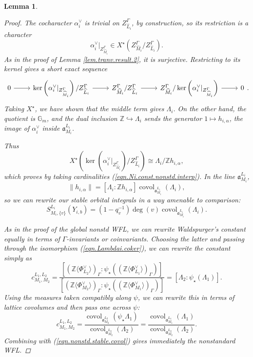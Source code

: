 \documentclass[openany]{amsbook}
\newtheorem{lemma}[theorem]{Lemma}
\theoremstyle{definition}
\theoremstyle{remark}
\numberwithin{equation}{section}
\newcommand{\Z}{\mathbb{Z}}
\newcommand{\G}{\mathbb{G}}
\renewcommand{\-}{\operatorname{-}}
\renewcommand{\a}{\mathfrak{a}}
\newcommand{\on}[1]{\operatorname{#1}}
\begin{document}
\begin{lemma}
\begin{proof}
        The cocharacter $\alpha_i^\vee$ is trivial on $Z_{\widehat{L}_i}^\Gamma$, by construction, so its restriction is a character
        $$
            \alpha_i^\vee |_{Z_{\widehat{M}_i}^\Gamma} \in X^\star\left(Z_{\widehat{M}_i}^\Gamma/Z_{\widehat{L}_i}^\Gamma\right).
        $$
        As in the proof of Lemma \ref{lem.tranv.result.2}, it is surjective. Restricting to its kernel gives a short exact sequence
        $$
        \begin{tikzcd}
            0 \ar[r] & \ker\left( \alpha_i^\vee |_{Z_{\widehat{M}_i}^\Gamma}\right)/Z_{\widehat{L}_i}^\Gamma \ar[r] & Z_{\widehat{M}_i}^\Gamma/Z_{\widehat{L}_i}^\Gamma \ar[r] & Z_{\widehat{M}_i}^\Gamma/\ker\left( \alpha_i^\vee |_{Z_{\widehat{M}_i}^\Gamma}\right) \ar[r] & 0
        \end{tikzcd}.
        $$
        Taking $X^\star$, we have shown that the middle term gives $\Lambda_i$. On the other hand, the quotient is $\G_m$, and the dual inclusion $\Z \hookrightarrow \Lambda_i$ sends the generator $1 \mapsto h_{i, \alpha}$, the image of $\alpha_i^\vee$ inside $\a_{M_i}^{L_i}$.
        
        Thus
        $$
            X^\star\left(\ker\left( \alpha_i^\vee |_{Z_{\widehat{M}_i}^\Gamma}\right) / Z_{\widehat{L}_i}^\Gamma \right) \cong \Lambda_i/\Z h_{i, \alpha},
        $$
        which proves by taking cardinalities (\ref{eqn.Ni.const.nonstd.interp}). In the line $\a_{M_i}^{L_i}$, 
        $$
            \|h_{i, \alpha}\| = [\Lambda_i : \Z h_{i,\alpha}] \on{covol}_{\a_{M_i}^{L_i}}(\Lambda_i),
        $$
        so we can rewrite our stable orbital integrals in a way amenable to comparison:
        \begin{equation}
            S_{M_i, \{v\}}^{L_i}(Y_{i,b}) = (1 - q_v^{-1}) \deg(v) \on{covol}_{\a_{M_i}^{L_i}}(\Lambda_i).\label{eqn.nonstd.stable.covol}
        \end{equation}

        As in the proof of the global nonstd WFL, we can rewrite Waldspurger's constant equally in terms of $\Gamma$-invariants or coinvariants. Choosing the latter and passing through the isomorphism (\ref{eqn.Lambdai.coker}), we can rewrite the constant simply as
        $$
            c_{M_1, M_2}^{L_1, L_2} = \frac{[(\Z \langle \Phi_{L_2}^\vee \rangle)_{\Gamma} : \psi_\star((\Z \langle \Phi_{L_1}^\vee \rangle)_{\Gamma})]}{[(\Z \langle \Phi_{M_2}^\vee \rangle)_{\Gamma} : \psi_\star((\Z \langle \Phi_{M_1}^\vee \rangle)_{\Gamma})]} = [\Lambda_2 : \psi_\star(\Lambda_1)].
        $$
        Using the measures taken compatibly along $\psi$, we can rewrite this in terms of lattice covolumes and then pass one across $\psi$:
        $$
            c_{M_1, M_2}^{L_1, L_2} = \frac{\on{covol}_{\a_{M_2}^{L_2}}(\psi_\star\Lambda_1)}{\on{covol}_{\a_{M_2}^{L_2}}(\Lambda_2)} = \frac{\on{covol}_{\a_{M_1}^{L_1}}(\Lambda_1)}{\on{covol}_{\a_{M_2}^{L_2}}(\Lambda_2)}.
        $$
        Combining with (\ref{eqn.nonstd.stable.covol}) gives immediately the nonstandard WFL.
        
        

        
        
        
    \end{proof}
\end{lemma}
\end{document}
